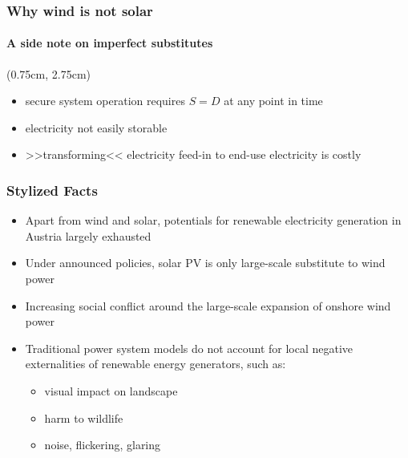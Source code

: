 \documentclass[aspectratio=1610, xcolor=dvipsnames,handout]{beamer} %
\begin{document}
\begin{frame}
\frametitle{Why wind is not solar}
\framesubtitle{A side note on imperfect substitutes}
\begin{textblock*}{4cm}(0.75cm, 2.75cm)
\begin{itemize}
\item secure system operation requires $S=D$ at any point in time 
\item electricity not easily storable 
\item >>transforming<< electricity feed-in to end-use electricity is costly
\end{itemize}
\end{textblock*}

\end{frame}



\begin{frame}
\frametitle{Stylized Facts}
\begin{itemize}
\item Apart from wind and solar, potentials for renewable electricity generation in Austria largely exhausted
\item Under announced policies, solar PV is only large-scale substitute to wind power \pause
\item Increasing social conflict around the large-scale expansion of onshore wind power
\item Traditional power system models do not account for local negative externalities of renewable energy generators, such as:
	\begin{itemize}
	\item visual impact on landscape
	\item harm to wildlife
	\item noise, flickering, glaring
	\end{itemize}
\end{itemize}
\end{frame}
\end{document}
